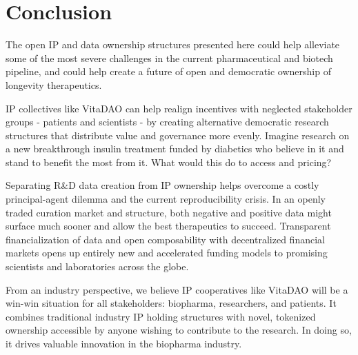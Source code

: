 \documentclass[12pt,letterpaper]{article}
\begin{document}
\section{Conclusion}
The open IP and data ownership structures presented here could help alleviate some of the most severe challenges in the current pharmaceutical and biotech pipeline, and could help create a future of open and democratic ownership of longevity therapeutics. 

IP collectives like VitaDAO can help realign incentives with neglected stakeholder groups - patients and scientists - by creating alternative democratic research structures that distribute value and governance more evenly. Imagine research on a new breakthrough insulin treatment funded by diabetics who believe in it and stand to benefit the most from it. What would this do to access and pricing?

Separating R\&D data creation from IP ownership helps overcome a costly principal-agent dilemma and the current reproducibility crisis. In an openly traded curation market and structure, both negative and positive data might surface much sooner and allow the best therapeutics to succeed. Transparent financialization of data  and open composability with decentralized financial markets opens up entirely new and accelerated funding models to promising scientists and laboratories across the globe. 

From an industry perspective, we believe IP cooperatives like VitaDAO will be a win-win situation for all stakeholders: biopharma, researchers, and patients. It combines traditional industry IP holding structures with novel, tokenized ownership accessible by anyone wishing to contribute to the research. In doing so, it drives valuable innovation in the biopharma industry.

\clearpage


\raggedright 


 
\end{document}
